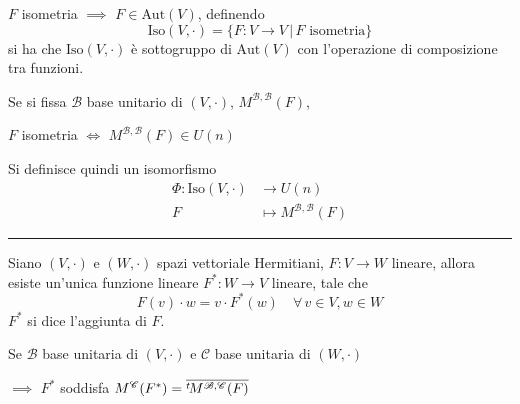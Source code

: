 



$ F $ isometria $ \implies $ $ F \in \text{Aut}(V) $, definendo \[
    \text{Iso}(V, \cdot)=\{F:V \to V\,|\, F\text{ isometria}\}
\] si ha che $ \text{Iso}(V, \cdot) $ è sottogruppo di $ \text{Aut}(V) $ con l'operazione di composizione tra funzioni.

Se si fissa $ \mathscr{B} $ base unitario di $ (V, \cdot ) $, $ M^{ \mathscr{B}, \mathscr{B}}(F) $, 

$ F $ isometria $ \iff $ $ M^{ \mathscr{B}, \mathscr{B}}(F) \in U(n) $

Si definisce quindi un isomorfismo \begin{align*}
\Phi: \text{Iso}(V, \cdot) & \to  U(n)\\
F & \mapsto M^{ \mathscr{B}, \mathscr{B}}(F)
\end{align*}

\rule{7em}{.4pt}

Siano $ (V, \cdot ) $ e $ (W, \cdot ) $ spazi vettoriale Hermitiani, $ F: V \to W $ lineare, allora esiste un'unica funzione lineare $ F^{*}: W \to V$ lineare, tale che \[
    F(v) \cdot w = v \cdot F^{*}(w)\quad \forall\,v \in V, w \in W
\] 
$ F^{*} $ si dice l'aggiunta di $ F $.

Se $ \mathscr{B} $ base unitaria di $ (V, \cdot ) $ e $ \mathscr{C} $ base unitaria di $ (W, \cdot ) $ 

$\implies$ $ F^{*} $ soddisfa $ M^{ \mathscr{C}}(F^{*})=\overline{\null^{t}\!M^{ \mathscr{B}, \mathscr{C}}(F)} $

